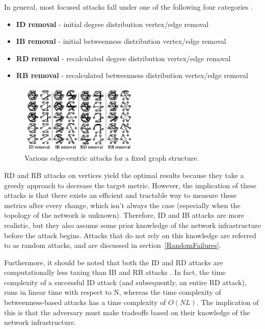 \documentclass[11pt]{article}
\begin{document}
In general, most focused attacks fall under one of the following four categories \cite{Attacks}.
\begin{itemize}
	\item \textbf{ID removal} - initial degree distribution vertex/edge removal
	\item \textbf{IB removal} - initial betweenness distribution vertex/edge removal
	\item \textbf{RD removal} - recalculated degree distribution vertex/edge removal
	\item \textbf{RB removal} - recalculated betweenness distribution vertex/edge removal
\end{itemize}

\begin{figure}[h!]
	\label{fig:Onion}
	\centering
		\includegraphics[width=0.5\textwidth]{edge_attacks.png}
	\caption{Various edge-centric attacks for a fixed graph structure.}
\end{figure}

RD and RB attacks on vertices yield the optimal results because they take a greedy approach to decrease the target metric. However, the implication of these attacks is that there exists an efficient and tractable way to measure these metrics after every change, which isn't always the case (especially when the topology of the network is unknown). Therefore, ID and IB attacks are more realistic, but they also assume some prior knowledge of the network infrastructure before the attack begins. Attacks that do not rely on this knowledge are referred to as random attacks, and are discussed in section~\ref{RandomFailures}.

Furthermore, it should be noted that both the ID and RD attacks are computationally less taxing than IB and RB attacks \cite{Attacks}. In fact, the time complexity of a successful ID attack (and subsequently, an entire RD attack), runs in linear time with respect to N, whereas the time complexity of betweenness-based attacks has a time complexity of $O(NL)$. The implication of this is that the adversary must make tradeoffs based on their knowledge of the network infrastructure.
\end{document}
